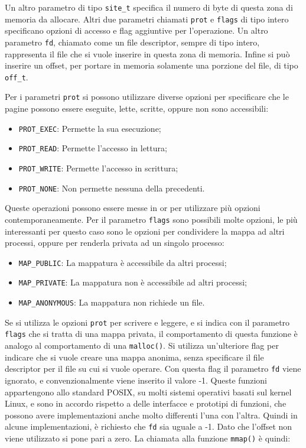 \documentclass{article}
\numberwithin{equation}{subsection}
\begin{document}
Un altro parametro di tipo \verb|site_t| specifica il numero di byte di questa zona di memoria da 
allocare. Altri due parametri chiamati \verb|prot| e \verb|flags| di tipo intero specificano 
opzioni di accesso e flag aggiuntive per l'operazione. Un altro parametro \verb|fd|, chiamato 
come un file descriptor, sempre di tipo intero, rappresenta il file che si vuole inserire in questa zona di memoria. Infine si può inserire un offset, per portare in memoria solamente una 
porzione del file, di tipo \verb|off_t|. 

Per i parametri \verb|prot| si possono utilizzare diverse opzioni per 
specificare che le pagine possono essere eseguite, lette, scritte, oppure non sono 
accessibili:
\begin{itemize}
    \item \verb|PROT_EXEC|: Permette la sua esecuzione;
    \item \verb|PROT_READ|: Permette l'accesso in lettura;
    \item \verb|PROT_WRITE|: Permette l'accesso in scrittura;
    \item \verb|PROT_NONE|: Non permette nessuna della precedenti. 
\end{itemize}
Queste operazioni possono essere messe in or per utilizzare più opzioni 
contemporaneamente. Per il parametro \verb|flags| sono possibili molte opzioni, le 
più interessanti per questo caso sono le opzioni per condividere la mappa ad altri processi, oppure per renderla privata ad un singolo processo:
\begin{itemize}
    \item \verb|MAP_PUBLIC|: La mappatura è accessibile da altri processi;
    \item \verb|MAP_PRIVATE|: La mappatura non è accessibile ad altri processi;
    \item \verb|MAP_ANONYMOUS|: La mappatura non richiede un file.
\end{itemize} 
Se si utilizza le opzioni \verb|prot| per scrivere e leggere, e si indica con il parametro \verb|flags| che si tratta di una mappa privata, il comportamento di questa funzione è analogo al 
comportamento di una \verb|malloc()|. 
Si utilizza un'ulteriore flag per indicare che si vuole creare una mappa anonima, senza 
specificare il file descriptor per il file su cui si vuole operare. Con questa flag il parametro 
\verb|fd| viene ignorato, e convenzionalmente viene inserito il valore -1. 
Queste funzioni appartengono allo standard POSIX, su molti sistemi operativi basati sul kernel Linux, e sono in accordo rispetto a delle interfacce e prototipi di funzioni, che possono 
avere implementazioni anche molto differenti l'una con l'altra. Quindi in alcune implementazioni, è richiesto che \verb|fd| sia uguale a -1. Dato che l'offset non viene utilizzato si pone pari a zero. La chiamata alla funzione \verb|mmap()| è quindi:
\inputminted[firstline=32,lastline=32, breaklines, breakanywhere]{c}{./Esercitazione del 19-11-24/domanda4.c}
\end{document}

